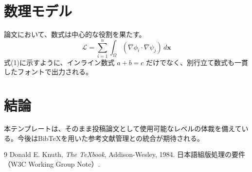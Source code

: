 \documentclass[
  paper=a4,
  fontsize=10.5pt,
  twocolumn,
  column_gap=2zw,
  number_of_lines=40,
  line_length=45zw
]{jlreq}
\theoremstyle{definition}
\theoremstyle{plain}
\theoremstyle{remark}
\begin{document}
\section{数理モデル}
論文において、数式は中心的な役割を果たす。
\begin{equation}
    \mathcal{L} = \sum_{i=1}^{n} \int_{\Omega} ( \nabla \phi_i \cdot \nabla \psi_j ) \, d\mathbf{x}
\end{equation}
式(1)に示すように、インライン数式 $a+b=c$ だけでなく、別行立て数式も一貫したフォントで出力される。

\section{結論}
本テンプレートは、そのまま投稿論文として使用可能なレベルの体裁を備えている。今後はBibTeXを用いた参考文献管理との統合が期待される。

\begin{thebibliography}{9}
Donald E. Knuth, \textit{The \TeX book}, Addison-Wesley, 1984.
日本語組版処理の要件（W3C Working Group Note）.
\end{thebibliography}
\end{document}

